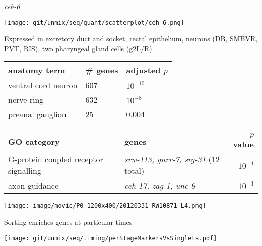 \documentclass[serif,9pt]{beamer}
\begin{document}
\begin{frame}{{\em ceh-6}}

\begin{minipage}{0.4\textwidth}
\texttt{[image: git/unmix/seq/quant/scatterplot/ceh-6.png]}
\end{minipage}
\begin{minipage}{0.58\textwidth}

{\small Expressed in excretory duct and socket, rectal epithelium,
neurons (DB, SMBVR, PVT, RIS),
two pharyngeal gland cells (g2L/R) }


\begin{table}[!tbp]\scriptsize
\begin{tabular}{lll}
anatomy term & \# genes & adjusted $p$ \\
\hline
ventral cord neuron & 607 & $10^{-10}$ \\
nerve ring & 632 & $10^{-8}$ \\
preanal ganglion & 25 & 0.004 \\
\end{tabular}
\end{table}
\end{minipage}

\begin{table}\footnotesize
\begin{tabular}{llr}
GO category & genes & $p$ value \\
\hline
G-protein coupled receptor signalling & {\em srw-113, gnrr-7, srg-31} (12 total) & $10^{-4}$ \\
axon guidance & {\em ceh-17, zag-1, unc-6} & $10^{-3}$ \\
\end{tabular}
\end{table}

\texttt{[image: image/movie/P0\_1200x400/20120331\_RW10871\_L4.png]}

\end{frame}

\begin{frame}{Sorting enriches genes at particular times}

\begin{centering}
\texttt{[image: git/unmix/seq/timing/perStageMarkersVsSinglets.pdf]}
\end{centering}

\end{frame}
\end{document}
